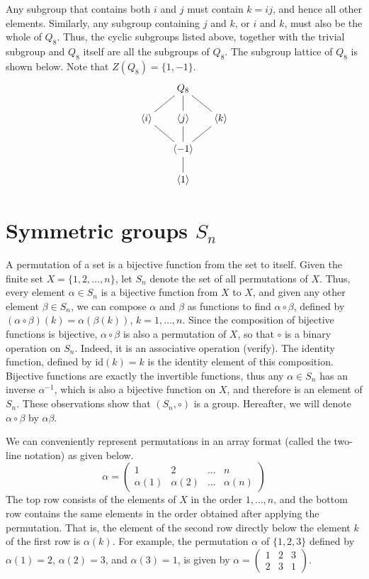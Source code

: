 \documentclass[svgnames]{article}
\theoremstyle{definition}
\theoremstyle{remark}
\newcommand{\id}{\mathrm{id}}
\newcommand{\newterm}[1]{{\color{alertcolor} #1}}
\begin{document}
\begin{appendices}
Any subgroup that contains both $i$ and $j$ must contain $k = ij$, and hence all other elements. Similarly, any subgroup containing $j$ and $k$, or $i$ and $k$, must also be the whole of $Q_8$. Thus, the cyclic subgroups listed above, together with the trivial subgroup and $Q_8$ itself are all the subgroups of $Q_8$. The subgroup lattice of $Q_8$ is shown below. Note that $Z(Q_8) = \{1, -1\}$.
\begin{equation*}
\xymatrix@=1.5em{
&	Q_8 \ar@{-}[dl] \ar@{-}[d] \ar@{-}[dr]	\\
\langle i \rangle	&	\langle j \rangle	&	\langle k \rangle\\
	&	\langle -1 \rangle	\ar@{-}[ul] \ar@{-}[u] \ar@{-}[ur]	\\
	&	\langle	1 \rangle	\ar@{-}[u]
}
\end{equation*}

\section{Symmetric groups $S_n$}\label{sec:SymGroups}
A \newterm{permutation} of a set is a bijective function from the set to itself. Given the finite set $X = \{1, 2, \ldots, n\}$, let $S_n$ denote the set of all permutations of $X$. Thus, every element $\alpha \in S_n$ is a bijective function from $X$ to $X$, and given any other element $\beta \in S_n$, we can compose $\alpha$ and $\beta$ as functions to find $\alpha \circ \beta$, defined by $(\alpha \circ \beta)(k) = \alpha(\beta(k))$, $k = 1, \ldots, n$. Since the composition of bijective functions is bijective, $\alpha \circ \beta$ is also a permutation of $X$, so that $\circ$ is a binary operation on $S_n$. Indeed, it is an associative operation {\small (verify)}. The identity function, defined by $\id(k) = k$ is the identity element of this composition. Bijective functions are exactly the invertible functions, thus any $\alpha \in S_n$ has an inverse $\alpha^{-1}$, which is also a bijective function on $X$, and therefore is an element of $S_n$. These observations show that $(S_n, \circ)$ is a group. Hereafter, we will denote $\alpha \circ \beta$ by $\alpha \beta$.

We can conveniently represent permutations in an array format (called the \newterm{two-line notation}) as given below.
\begin{equation*}
\alpha = \begin{pmatrix}
1			&	 2	 		&	 \ldots	&	 n \\
\alpha(1)	&	\alpha(2)	&	\ldots	&	\alpha(n)
\end{pmatrix}
\end{equation*}
The top row consists of the elements of $X$ in the order $1, \ldots, n$, and the bottom row contains the same elements in the order obtained after applying the permutation. That is, the element of the second row directly below the element $k$ of the first row is $\alpha(k)$. For example, the permutation $\alpha$ of $\{1, 2, 3\}$ defined by $\alpha(1) = 2$, $\alpha(2) = 3$, and $\alpha(3) = 1$, is given by $\alpha = \begin{pmatrix}
1 & 2 & 3\\
2 & 3 & 1
\end{pmatrix}$.


\end{appendices}
\end{document}
